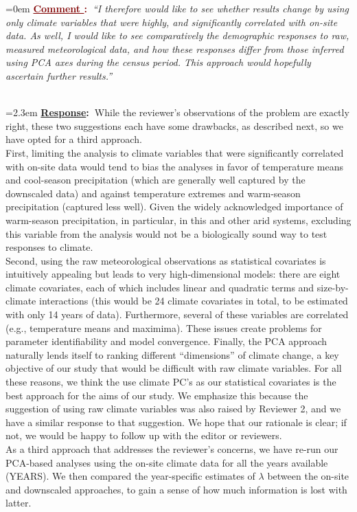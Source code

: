 \documentclass[12pt]{article}
\newcounter{cN}
\newcommand{\comment}[1]{
	\vspace{2em}
	\refstepcounter{cN} %
	\noindent \hangindent=0em \textbf{\textcolor{Maroon}{\uline{Comment \thecN}:~}}\emph{``#1''}
	}
\newcommand{\response}[1]{
	\\[0.25em]
	\hangindent=2.3em \textbf{\textcolor{NavyBlue}{\uline{Response}:~}}#1
	}
\begin{document}
\comment{I therefore would like to see whether results change by using only climate variables that were highly, and significantly correlated with on-site data. As well, I would like to see comparatively the demographic responses to raw, measured meteorological data, and how these responses differ from those inferred using PCA axes during the census period. 
This approach would hopefully ascertain further results.}
\response{While the reviewer's observations of the problem are exactly right, these two suggestions each have some drawbacks, as described next, so we have opted for a third approach. 
\\
First, limiting the analysis to climate variables that were significantly correlated with on-site data would tend to bias the analyses in favor of temperature means and cool-season precipitation (which are generally well captured by the downscaled data) and against temperature extremes and warm-season precipitation (captured less well). 
Given the widely acknowledged importance of warm-season precipitation, in particular, in this and other arid systems, excluding this variable from the analysis would not be a biologically sound way to test responses to climate. 
\\
Second, using the raw meteorological observations as statistical covariates is intuitively appealing but leads to very high-dimensional models: there are eight climate covariates, each of which includes linear and quadratic terms and size-by-climate interactions (this would be 24 climate covariates in total, to be estimated with only 14 years of data).
Furthermore, several of these variables are correlated (e.g., temperature means and maximima). 
These issues create problems for parameter identifiability and model convergence.
Finally, the PCA approach naturally lends itself to ranking different ``dimensions'' of climate change, a key objective of our study that would be difficult with raw climate variables. 
For all these reasons, we think the use climate PC's as our statistical covariates is the best approach for the aims of our study. 
We emphasize this because the suggestion of using raw climate variables was also raised by Reviewer 2, and we have a similar response to that suggestion. 
We hope that our rationale is clear; if not, we would be happy to follow up with the editor or reviewers. 
\\
As a third approach that addresses the reviewer's concerns, we have re-run our PCA-based analyses using the on-site climate data for all the years available (YEARS). 
We then compared the year-specific estimates of $\lambda$ between the on-site and downscaled approaches, to gain a sense of how much information is lost with latter. 
}
\end{document}
